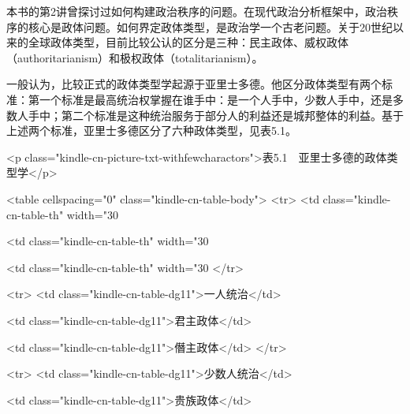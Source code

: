 





本书的第2讲曾探讨过如何构建政治秩序的问题。在现代政治分析框架中，政治秩序的核心是政体问题。如何界定政体类型，是政治学一个古老问题。关于20世纪以来的全球政体类型，目前比较公认的区分是三种：民主政体、威权政体（authoritarianism）和极权政体（totalitarianism）。

一般认为，比较正式的政体类型学起源于亚里士多德。他区分政体类型有两个标准：第一个标准是最高统治权掌握在谁手中：是一个人手中，少数人手中，还是多数人手中；第二个标准是这种统治服务于部分人的利益还是城邦整体的利益。基于上述两个标准，亚里士多德区分了六种政体类型，见表5.1。

<p class="kindle-cn-picture-txt-withfewcharactors">表5.1　亚里士多德的政体类型学</p>

<table cellspacing="0" class="kindle-cn-table-body">
 <tr>
 <td class="kindle-cn-table-th" width="30%

 <td class="kindle-cn-table-th" width="30%

 <td class="kindle-cn-table-th" width="30%
</tr>

 <tr>
 <td class="kindle-cn-table-dg11">一人统治</td>

 <td class="kindle-cn-table-dg11">君主政体</td>

 <td class="kindle-cn-table-dg11">僭主政体</td>
</tr>

 <tr>
 <td class="kindle-cn-table-dg11">少数人统治</td>

 <td class="kindle-cn-table-dg11">贵族政体</td>

